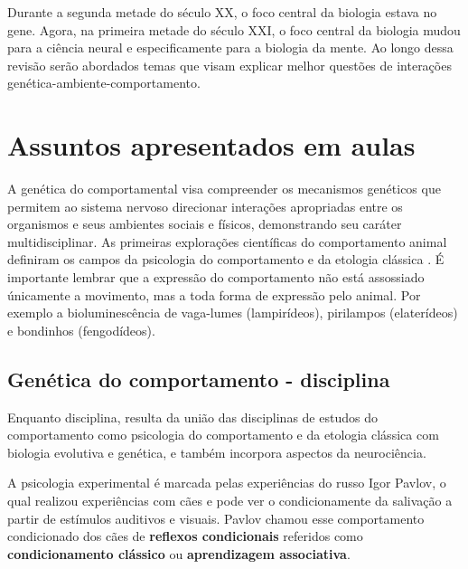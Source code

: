\documentclass[
	article,			%
	12pt,				%
	oneside,			%
	a4paper,			%
	english,			%
	brazil,				%
	sumario=tradicional
	]{abntex2}
\begin{document}
Durante a segunda metade do século XX, o foco central da biologia estava no gene. Agora, na primeira metade do século XXI, o foco central da biologia mudou para a ciência neural e especificamente para a biologia da mente.
\cite{kandel2000principles} Ao longo dessa revisão serão abordados temas que visam explicar melhor questões de interações genética-ambiente-comportamento.
\section{Assuntos apresentados em aulas}
\label{aulas}
A genética do comportamental visa compreender os mecanismos genéticos que permitem ao sistema nervoso direcionar interações apropriadas entre os organismos e seus ambientes sociais e físicos, demonstrando seu caráter multidisciplinar.
As primeiras explorações científicas do comportamento animal definiram os campos da  psicologia do comportamento e da etologia clássica \cite{anholt2009principles}.
É importante lembrar que a expressão do comportamento não está assossiado únicamente a movimento, mas a toda forma de expressão pelo animal. Por exemplo a bioluminescência de vaga-lumes (lampirídeos), pirilampos (elaterídeos) e bondinhos (fengodídeos).

\subsection{Genética do comportamento - disciplina}
Enquanto disciplina, resulta da união das disciplinas de estudos do comportamento como  psicologia do comportamento e da etologia clássica com biologia evolutiva e genética, e também incorpora aspectos da neurociência.


A psicologia experimental é marcada pelas experiências do russo Igor Pavlov, o qual realizou experiências com cães e pode ver o condicionamente da salivação a partir de estímulos auditivos e visuais. Pavlov chamou esse comportamento condicionado dos cães de \textbf{reflexos condicionais} referidos como \textbf{condicionamento clássico} ou \textbf{aprendizagem associativa}.
\end{document}

